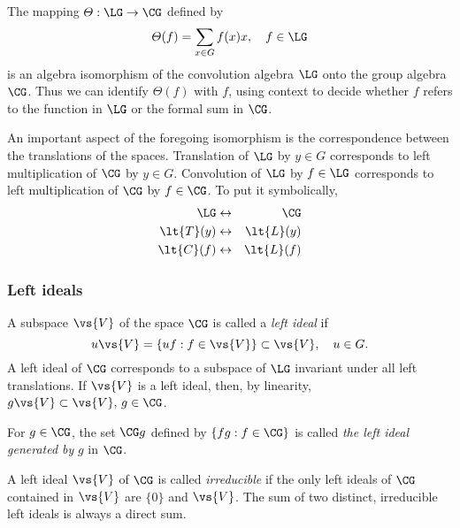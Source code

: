 The mapping $\varTheta: \LG \to \CG$ defined by
\[
\varTheta(f) = \sum_{x\in G} f(x) x, \quad f\in \LG
\]
is an algebra isomorphism of the convolution algebra $\LG$
onto the group algebra $\CG$.  Thus we can identify
$\varTheta(f)$ with $f$, using  context to decide whether
$f$ refers to the function in $\LG$ or the formal sum in
$\CG$.  

An important aspect of the foregoing isomorphism is the
correspondence between the translations of the spaces.
Translation of $\LG$ by $y\in G$ %
corresponds to left multiplication of $\CG$ by $y\in G$.
Convolution of $\LG$ by $f\in \LG$ corresponds to
left multiplication of $\CG$ by $f\in \CG$. To put it
symbolically,
\begin{eqnarray*}
      \LG & \leftrightarrow & \CG \\
\lt{T}(y) & \leftrightarrow & \lt{L}(y)\\
\lt{C}(f) & \leftrightarrow & \lt{L}(f)
\end{eqnarray*}


\subsubsection{Left ideals}
A subspace $\vs{V}$ of the space $\CG$ is called a
\emph{left ideal} if 
\[
u\vs{V} = \{uf : f \in \vs{V}\} \subset \vs{V}, \quad u \in G. 
\]
A left ideal of $\CG$ corresponds to a subspace of $\LG$
invariant under all left translations.  If $\vs{V}$ is a
left ideal, then, by linearity, 
$g\vs{V} \subset \vs{V}, \, g \in \CG$.

For $g\in \CG$, the set $\CG g$ defined by 
$\{fg : f \in \CG\}$ is %
called 
\emph{the left ideal generated by} $g$ in $\CG$. 

A left ideal $\vs{V}$ of $\CG$ is called \emph{irreducible} if the only left ideals
of $\CG$ contained in $\vs{V}$ are $\{0\}$ and $\vs{V}$. The sum of two distinct,
irreducible left ideals is always a direct sum.

